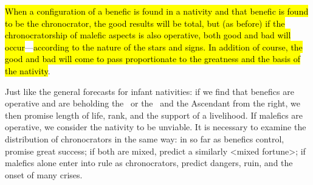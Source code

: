 \hl{When a configuration of a benefic is found in a nativity and that benefic is found to be the chronocrator, the good results will be total,
but (as before) if the chronocratorship of malefic aspects is also operative, both good and bad will occur}—\hl{according to the nature of the stars and signs. In addition of course, the good and bad will come to pass proportionate to the greatness and the basis of the nativity}.

Just  like the general forecasts for infant nativities: if we find that benefics are operative and are beholding the \Sun\, or the \Moon\, and the Ascendant from the right, we then promise length of life, rank, and the support of a livelihood. If malefics are operative, we consider the nativity to be unviable. It is necessary to examine the distribution of
chronocrators in the same way: in so far as benefics control, promise great success; if both are mixed, predict a similarly <mixed fortune>; if malefics alone enter into rule as chronocrators, predict dangers, ruin, and the onset of many crises.

